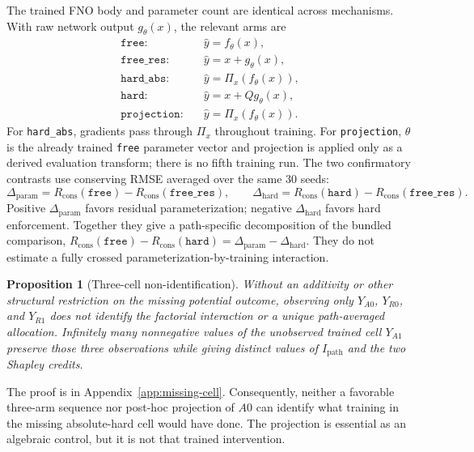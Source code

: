 \documentclass{article}
\newtheorem{proposition}{Proposition}
\newcommand{\Rcons}{R_{\mathrm{cons}}}
\newcommand{\dparam}{\Delta_{\mathrm{param}}}
\newcommand{\dhard}{\Delta_{\mathrm{hard}}}
\newcommand{\Ipath}{I_{\mathrm{path}}}
\begin{document}
The trained FNO body and parameter count are identical across mechanisms. With raw network output
$g_\theta(x)$, the relevant arms are
\begin{align}
  \texttt{free}:&\quad \hat y=f_\theta(x), \\
  \texttt{free\_res}:&\quad \hat y=x+g_\theta(x), \\
  \texttt{hard\_abs}:&\quad \hat y=\Pi_x(f_\theta(x)), \\
  \texttt{hard}:&\quad \hat y=x+Qg_\theta(x), \\
  \texttt{projection}:&\quad \hat y=\Pi_x(f_\theta(x)).
\end{align}
For \texttt{hard\_abs}, gradients pass through $\Pi_x$ throughout training. For
\texttt{projection}, $\theta$ is the already trained \texttt{free} parameter vector and projection
is applied only as a derived evaluation transform; there is no fifth training run.
The two confirmatory contrasts use conserving RMSE averaged over the same 30 seeds:
\begin{equation}
  \dparam=\Rcons(\texttt{free})-\Rcons(\texttt{free\_res}),\qquad
  \dhard=\Rcons(\texttt{hard})-\Rcons(\texttt{free\_res}).
\end{equation}
Positive $\dparam$ favors residual parameterization; negative $\dhard$ favors hard enforcement.
Together they give a path-specific decomposition of the bundled comparison,
$\Rcons(\texttt{free})-\Rcons(\texttt{hard})=\dparam-\dhard$. They do not estimate a fully crossed
parameterization-by-training interaction.

\begin{proposition}[Three-cell non-identification]
\label{prop:missing-cell}
Without an additivity or other structural restriction on the missing potential outcome, observing
only $Y_{A0}$, $Y_{R0}$, and $Y_{R1}$ does not identify the factorial interaction or a unique
path-averaged allocation. Infinitely many nonnegative values of the unobserved trained cell
$Y_{A1}$ preserve those three observations while giving distinct values of $\Ipath$ and the two
Shapley credits.
\end{proposition}

The proof is in Appendix~\ref{app:missing-cell}. Consequently, neither a favorable three-arm
sequence nor post-hoc projection of $A0$ can identify what training in the missing absolute-hard
cell would have done. The projection is essential as an algebraic control, but it is not that
trained intervention.
\end{document}
